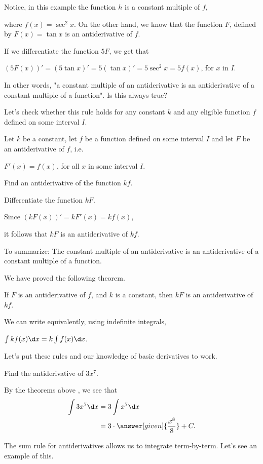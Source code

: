 \documentclass{ximera}
\begin{document}
Notice, in this example the function $h$ is a constant multiple of $f$, 

where $f(x)=\sec^{2}{x}$. On the other hand, we know that the function $F$, defined by 
$F(x)=\tan{x}$ is an antiderivative of $f$.

If we  differentiate the function $5F$, we get that

  $\left(5F(x)\right)'=\left(5\tan{x}\right)'=5\left(\tan{x}\right)'=5\sec^{2}{x}=5f(x)$, for $x$ in $I$.
  
  In other words, "a constant multiple of an antiderivative is an antiderivative of a constant multiple of a function".
Is this always true?

Let's check whether this rule holds for  any constant $k$ and any eligible  function $f$ defined on some interval $I$.
 \begin{question}
Let $k$ be a constant, let $f$ be a function defined on some interval $I$ and let $F$ be an antiderivative of $f$, i.e.

$F'(x)=f(x)$, for all  $x$ in some interval $I$.

  Find an antiderivative of the function $k f$.
    \begin{hint}
    Differentiate the function $kF$.
     \end{hint}
     Since
     $\left(kF(x)\right)'=kF'(x)=kf(x)$,
     
     
   it follows that  $kF$ is an antiderivative of $kf$. 
 
 To summarize: The constant multiple of an antiderivative is an antiderivative of a constant multiple of a function. 
\end{question}
We have proved the following theorem.
\begin{theorem}\label{theorem:CMRA}
If $F$ is an antiderivative of $f$, and $k$ is a constant, then $kF$
is an antiderivative of $kf$.

We can write equivalently, using indefinite integrals, 

$\int kf(x) \d x= k\int f(x)\d x$.
\end{theorem}
Let's put these rules and our knowledge of basic derivatives to work.
\begin{example}
Find the antiderivative of $3 x^7$.
\begin{explanation}
By the theorems above , we see that
\begin{align*}
\int 3 x^7 \d x &= 3 \int x^7 \d x\\
&= 3 \cdot \answer[given]{\frac{x^8}{8}}+C.
\end{align*}
\end{explanation}
\end{example}
The sum rule for antiderivatives allows us to integrate
term-by-term. Let's see an example of this.
\end{document}
